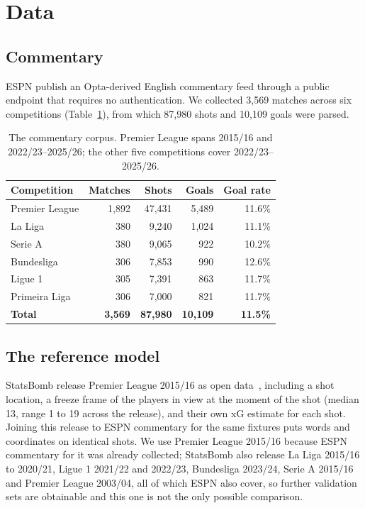 \documentclass[conference]{IEEEtran}
\newcommand{\num}[1]{\mbox{#1}}
\begin{document}
\section{Data}
\label{sec:data}

\subsection{Commentary}

ESPN publish an Opta-derived English commentary feed through a public endpoint
that requires no authentication. We collected \num{3,569} matches across six
competitions (Table~\ref{tab:corpus}), from which \num{87,980} shots and
\num{10,109} goals were parsed.

\begin{table}[t]
\caption{The commentary corpus. Premier League spans 2015/16 and
2022/23--2025/26; the other five competitions cover 2022/23--2025/26.}
\label{tab:corpus}
\centering
\begin{tabular}{lrrrr}
\toprule
Competition & Matches & Shots & Goals & Goal rate \\
\midrule
Premier League & \num{1,892} & \num{47,431} & \num{5,489} & 11.6\% \\
La Liga        & 380 & \num{9,240} & \num{1,024} & 11.1\% \\
Serie A        & 380 & \num{9,065} & 922         & 10.2\% \\
Bundesliga     & 306 & \num{7,853} & 990         & 12.6\% \\
Ligue 1        & 305 & \num{7,391} & 863         & 11.7\% \\
Primeira Liga  & 306 & \num{7,000} & 821         & 11.7\% \\
\midrule
\textbf{Total} & \textbf{\num{3,569}} & \textbf{\num{87,980}} &
\textbf{\num{10,109}} & \textbf{11.5\%} \\
\bottomrule
\end{tabular}
\end{table}

\subsection{The reference model}

StatsBomb release Premier League 2015/16 as open
data~\cite{statsbomb2024open}, including a shot location, a freeze frame of
the players in view at the moment of the shot (median 13, range 1 to 19 across
the release), and their own xG estimate for each shot. Joining this
release to ESPN commentary for the same fixtures puts words and coordinates on
identical shots. We use Premier League 2015/16 because ESPN commentary for it
was already collected; StatsBomb also release La Liga 2015/16 to 2020/21,
Ligue 1 2021/22 and 2022/23, Bundesliga 2023/24, Serie A 2015/16 and Premier
League 2003/04, all of which ESPN also cover, so further validation sets are
obtainable and this one is not the only possible comparison.
\end{document}
